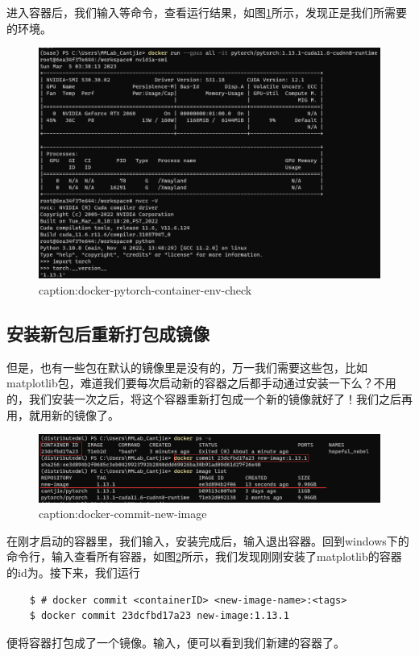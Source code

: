进入容器后，我们输入等命令，查看运行结果，如图\ref{fig:docker-pytorch-container-env-check}所示，发现正是我们所需要的环境。
\begin{figure}[htbp]
	\centering
	\includegraphics[width=1\textwidth]{figures/docker-pytorch-container-env-check.png}
	\caption{caption:docker-pytorch-container-env-check}
	\label{fig:docker-pytorch-container-env-check}
\end{figure}


\subsection{安装新包后重新打包成镜像}\label{subsec:container-to-image}

但是，也有一些包在默认的镜像里是没有的，万一我们需要这些包，比如matplotlib包，难道我们要每次启动新的容器之后都手动通过安装一下么？不用的，我们安装一次之后，将这个容器重新打包成一个新的镜像就好了！我们之后再用，就用新的镜像了。

\begin{figure}[htbp]
	\centering
	\includegraphics[width=1\textwidth]{figures/docker-commit-new-image.png}
	\caption{caption:docker-commit-new-image}
	\label{fig:docker-commit-new-image}
\end{figure}

在刚才启动的容器里，我们输入，安装完成后，输入退出容器。回到windows下的命令行，输入查看所有容器，如图\ref{fig:docker-commit-new-image}所示，我们发现刚刚安装了matplotlib的容器的id为。接下来，我们运行
\begin{lstlisting}
	$ # docker commit <containerID> <new-image-name>:<tags>
	$ docker commit 23dcfbd17a23 new-image:1.13.1
\end{lstlisting}
便将容器打包成了一个镜像。输入，便可以看到我们新建的容器了。

